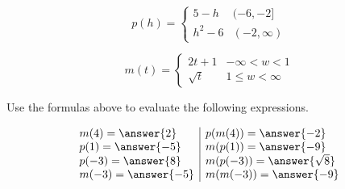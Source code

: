 \documentclass{ximera}
\author{Lee Wayand}
\begin{document}
\begin{exercise}





\[
p(h) = 
\begin{cases}
  5 - h &  (-6, -2]   \\
  h^2 - 6 & (-2, \infty)
\end{cases}
\]





\[
m(t) = 
\begin{cases}
  2t + 1 &   -\infty < w < 1 \\
  \sqrt{t} &  1 \leq w < \infty
\end{cases}
\]




\begin{question}


Use the formulas above to evaluate the following expressions.



\[
\begin{array}{l|l}
m(4) = \answer{2}  & p(m(4)) = \answer{-2}   \\
p(1) = \answer{-5}  & m(p(1)) = \answer{-9}   \\
p(-3) = \answer{8}  & m(p(-3)) = \answer{\sqrt{8}}   \\
m(-3) = \answer{-5}  & m(m(-3)) = \answer{-9}   \\

\end{array}
\]



\end{question}















\end{exercise}
\end{document}
